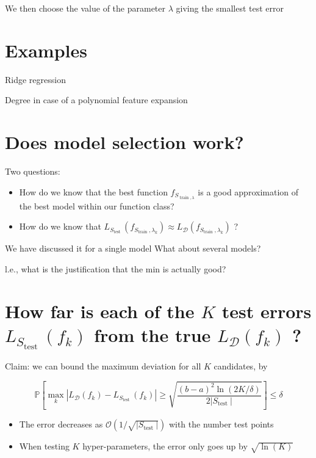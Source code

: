 We then choose the value of the parameter $\lambda$ giving the smallest test error

\section*{Examples}

Ridge regression


Degree in case of a polynomial feature expansion

\section*{Does model selection work?}
Two questions:

\begin{itemize}
  \item How do we know that the best function $f_{S_{\operatorname{train}, \lambda}}$ is a good approximation of the best model within our function class?

  \item How do we know that $L_{S_{\text {test }}}\left(f_{S_{\text {train }}, \lambda_{k}}\right) \approx L_{\mathscr{D}}\left(f_{S_{\text {train }}, \lambda_{k}}\right)$ ?

\end{itemize}

We have discussed it for a single model What about several models?

l.e., what is the justification that the min is actually good?

\section*{How far is each of the $K$ test errors $L_{S_{\text {test }}}\left(f_{k}\right)$ from the true $L_{\mathscr{D}}\left(f_{k}\right)$ ?}
Claim: we can bound the maximum deviation for all $K$ candidates, by

$$
\mathbb{P}\left[\max _{k}\left|L_{\mathscr{D}}\left(f_{k}\right)-L_{S_{\text {test }}}\left(f_{k}\right)\right| \geq \sqrt{\frac{(b-a)^{2} \ln (2 K / \delta)}{2\left|S_{\text {test }}\right|}}\right] \leq \delta
$$

\begin{itemize}
  \item The error decreases as $\mathcal{O}\left(1 / \sqrt{\left|S_{\text {test }}\right|}\right)$ with the number test points
  \item When testing $K$ hyper-parameters, the error only goes up by $\sqrt{\ln (K)}$
\end{itemize}

